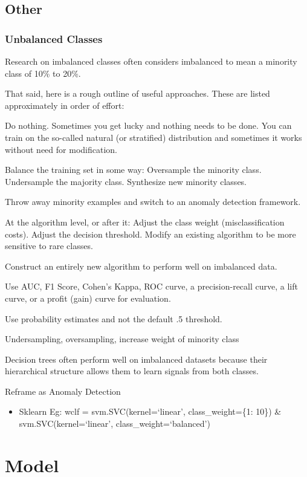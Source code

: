 \documentclass[]{book}
\providecommand{\tightlist}{%
  \setlength{\itemsep}{0pt}\setlength{\parskip}{0pt}}
\theoremstyle{definition}
\theoremstyle{definition}
\theoremstyle{definition}
\theoremstyle{remark}
\begin{document}
\section{Other}\label{other}

\subsection{Unbalanced Classes}\label{unbalanced-classes}

Research on imbalanced classes often considers imbalanced to mean a
minority class of 10\% to 20\%.

That said, here is a rough outline of useful approaches. These are
listed approximately in order of effort:

Do nothing. Sometimes you get lucky and nothing needs to be done. You
can train on the so-called natural (or stratified) distribution and
sometimes it works without need for modification.

Balance the training set in some way: Oversample the minority class.
Undersample the majority class. Synthesize new minority classes.

Throw away minority examples and switch to an anomaly detection
framework.

At the algorithm level, or after it: Adjust the class weight
(misclassification costs). Adjust the decision threshold. Modify an
existing algorithm to be more sensitive to rare classes.

Construct an entirely new algorithm to perform well on imbalanced data.

Use AUC, F1 Score, Cohen's Kappa, ROC curve, a precision-recall curve, a
lift curve, or a profit (gain) curve for evaluation.

Use probability estimates and not the default .5 threshold.

Undersampling, oversampling, increase weight of minority class

Decision trees often perform well on imbalanced datasets because their
hierarchical structure allows them to learn signals from both classes.

Reframe as Anomaly Detection

\begin{itemize}
\tightlist
\item
  Sklearn Eg: wclf = svm.SVC(kernel=`linear', class\_weight=\{1: 10\})
  \& svm.SVC(kernel=`linear', class\_weight=`balanced')
\end{itemize}

\chapter{Model}\label{model-2}
\end{document}
